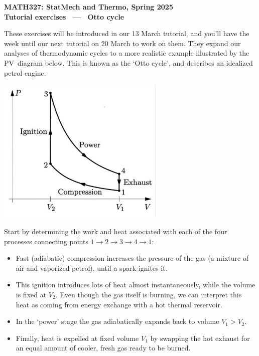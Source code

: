 \documentclass[12 pt]{article} %
\begin{document}
\newcommand{\thisunit}{MATH327 Tutorial (Cycle)}
\newcommand{\moddate}{Last modified 12 Mar.~2025}
\begin{center}
  {\Large \textbf{MATH327: StatMech and Thermo, Spring 2025}} \\[12 pt]
  {\Large \textbf{Tutorial exercises \ --- \ Otto cycle}} \\[24 pt]
\end{center}

These exercises will be introduced in our 13 March tutorial, and you'll have the week until our next tutorial on 20 March to work on them.
They expand our analyses of thermodynamic cycles to a more realistic example illustrated by the PV~diagram below.
This is known as the `Otto cycle', and describes an idealized petrol engine.

\vspace{-12 pt}
\begin{center}\includegraphics[width=0.6\textwidth]{figs/Otto.pdf}\end{center}
\vspace{-12 pt}

Start by determining the work and heat associated with each of the four processes connecting points $1 \to 2 \to 3 \to 4 \to 1$: \\[-30 pt]
\begin{itemize}
  \item Fast (adiabatic) compression increases the pressure of the gas (a mixture of air and vaporized petrol), until a spark ignites it.
  \item This ignition introduces lots of heat almost instantaneously, while the volume is fixed at $V_2$.
        Even though the gas itself is burning, we can interpret this heat as coming from energy exchange with a hot thermal reservoir.
  \item In the `power' stage the gas adiabatically expands back to volume $V_1 > V_2$. %
  \item Finally, heat is expelled at fixed volume $V_1$ by swapping the hot exhaust for an equal amount of cooler, fresh gas ready to be burned.
\end{itemize}
\end{document}

